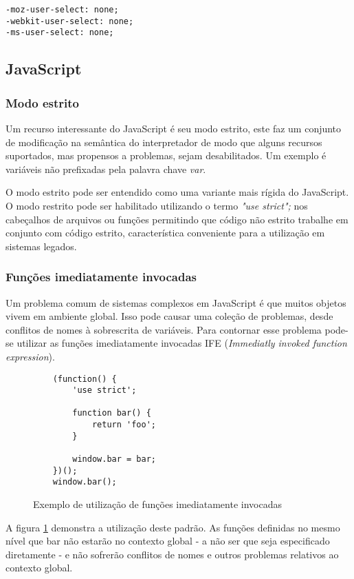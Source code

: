 \begin{verbatim}
-moz-user-select: none;
-webkit-user-select: none;
-ms-user-select: none;
\end{verbatim}

\subsection{JavaScript}

\subsubsection{Modo estrito}
Um recurso interessante do JavaScript é seu modo estrito, este faz
um conjunto de modificação na semântica do interpretador de modo
que alguns recursos suportados, mas propensos a problemas, sejam
desabilitados. Um exemplo é variáveis não prefixadas pela palavra
chave \textit{var}.

O modo estrito pode ser entendido como uma variante mais rígida
do JavaScript. O modo restrito pode ser habilitado utilizando o
termo \textit{"use strict";} nos cabeçalhos de arquivos ou funções
permitindo que código não estrito trabalhe em conjunto com código
estrito, característica conveniente para a utilização em sistemas
legados.

\subsubsection{Funções imediatamente invocadas}

Um problema comum de sistemas complexos em JavaScript é que muitos
objetos vivem em ambiente global. Isso pode causar uma coleção de
problemas, desde conflitos de nomes à sobrescrita de variáveis. Para
contornar esse problema pode-se utilizar as funções imediatamente
invocadas IFE (\textit{Immediatly invoked function expression}).

\begin{figure}
\centering
\begin{verbatim}
    (function() {
        'use strict';

        function bar() {
            return 'foo';
        }

        window.bar = bar;
    })();
    window.bar();
\end{verbatim}
\caption{Exemplo de utilização de funções imediatamente invocadas}
\label{fig:iife}
\end{figure}

A figura \ref{fig:iife} demonstra a utilização deste padrão. As
funções definidas no mesmo nível que bar não estarão no contexto
global - a não ser que seja especificado diretamente - e não sofrerão
conflitos de nomes e outros problemas relativos ao contexto global.

